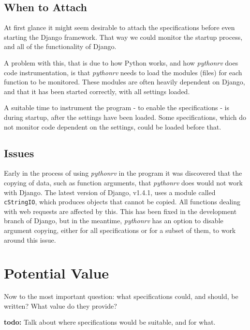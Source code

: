 \documentclass[a4paper,11pt]{kth-mag}
\newcommand{\todo}[1]{\textbf{todo: #1}}
\begin{document}
\subsection{When to Attach}

At first glance it might seem desirable to attach the specifications before
even starting the Django framework. That way we could monitor the startup
process, and all of the functionality of Django.

A problem with this, that is due to how Python works, and how \textit{pythonrv}
does code instrumentation, is that \textit{pythonrv} needs to load the modules
(files) for each function to be monitored. These modules are often heavily
dependent on Django, and that it has been started correctly, with all settings
loaded.

A suitable time to instrument the program - to enable the specifications - is
during startup, after the settings have been loaded. Some specifications, which
do not monitor code dependent on the settings, could be loaded before that.


\subsection{Issues}

Early in the process of using \textit{pythonrv} in the program it was
discovered that the copying of data, such as function arguments, that
\textit{pythonrv} does would not work with Django. The latest version of
Django, v1.4.1, uses a module called \texttt{cStringIO}, which produces objects
that cannot be copied. All functions dealing with web requests are affected by
this. This has been fixed in the development branch of Django, but in the
meantime, \textit{pythonrv} has an option to disable argument copying, either
for all specifications or for a subset of them, to work around this issue.


\section{Potential Value}

Now to the most important question: what specifications could, and should, be
written? What value do they provide?

\todo{}
Talk about where specifications would be suitable, and for what.




\end{document}
